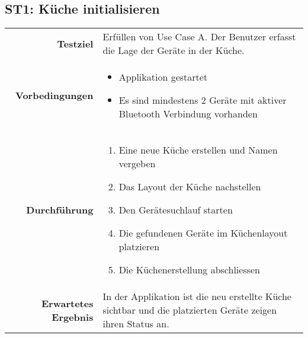 \subsection{ST1: Küche initialisieren}
\begin{table}[H]
\begin{tabularx}{\textwidth}{r X }
\textbf{Testziel} & Erfüllen von Use Case A. Der Benutzer erfasst die Lage der Geräte in der Küche. \\
\textbf{Vorbedingungen} & \begin{itemize}
\item Applikation gestartet
\item Es sind mindestens 2 Geräte mit aktiver Bluetooth Verbindung vorhanden
\end{itemize} \\
\textbf{Durchführung} & \begin{enumerate}
\item Eine neue Küche erstellen und Namen vergeben
\item Das Layout der Küche nachstellen
\item Den Gerätesuchlauf starten
\item Die gefundenen Geräte im Küchenlayout platzieren
\item Die Küchenerstellung abschliessen
\end{enumerate} \\
\textbf{Erwartetes Ergebnis} & In der Applikation ist die neu erstellte Küche sichtbar und die platzierten Geräte zeigen ihren Status an.\\
\end{tabularx}
\end{table}

